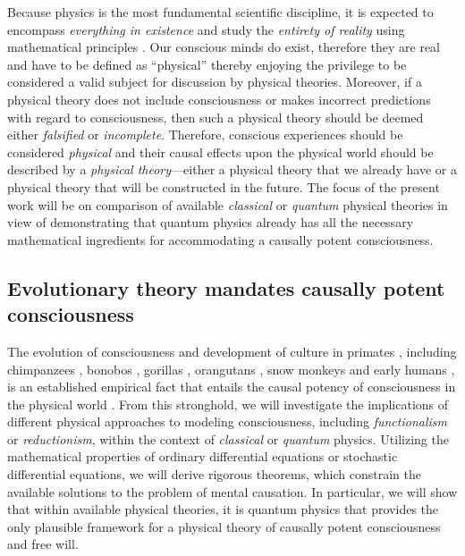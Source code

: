 \documentclass{ws-ijmpb}
\begin{document}
Because physics is the most fundamental scientific discipline, it
is expected to encompass \emph{everything in existence} and study
the \emph{entirety of reality} using mathematical principles \cite{Feynman2013}.
Our conscious minds do exist, therefore they are real and have to be defined as
``physical'' \cite{Georgiev2020a,Georgiev2020b} thereby enjoying
the privilege to be considered a valid subject for discussion by physical
theories. Moreover, if a physical theory does not include consciousness
or makes incorrect predictions with regard to consciousness, then
such a physical theory should be deemed either \emph{falsified} or \emph{incomplete}.
Therefore, conscious experiences should be considered \emph{physical} and their causal effects upon the physical world should be described by a \emph{physical theory}---either a physical theory that we already have or a physical theory that will be constructed in the future.
The focus of the present work will be on comparison of available \emph{classical} or \emph{quantum} physical theories in view of demonstrating that quantum physics already has all the necessary mathematical ingredients for accommodating a causally potent consciousness.

\subsection{Evolutionary theory mandates causally potent consciousness}

The evolution of consciousness and development
of culture in primates \cite{Imanishi1951,Imanishi1952,Imanishi1957,Imanishi1966,Matsuzawa2001,Gruber2012},
including chimpanzees \cite{Goodall1986,Whiten1999,Gruber2009,Lind2010,Boesch2020},
bonobos \cite{Samuni2020,vanLeeuwen2020}, gorillas \cite{Robbins2016},
orangutans \cite{Krutzen2011,Gruber2012b,Koops2014,Lameira2022},
snow monkeys \cite{Kawamura1959,Kawai1965,Leca2012} and early humans
\cite{Gross2020,Ehrenreich2019,Wade2006,Melcher2006,Harris2011,Herzog2010,Conard2009a,Conard2009b,Valladas2001},
is an established empirical fact that entails the causal potency of
consciousness in the physical world \cite{Popper1983,Eccles1991,Eccles1992,Eccles1994}.
From this stronghold, we will investigate the implications of
different physical approaches to modeling consciousness, including
\emph{functionalism} or \emph{reductionism}, within the context of
\emph{classical} or \emph{quantum} physics. Utilizing the
mathematical properties of ordinary differential equations or stochastic
differential equations, we will derive rigorous theorems, which constrain
the available solutions to the problem of mental causation.
In particular, we will show that within available physical theories, it is quantum physics that provides the only plausible framework
for a physical theory of causally potent consciousness and free will.
\end{document}
